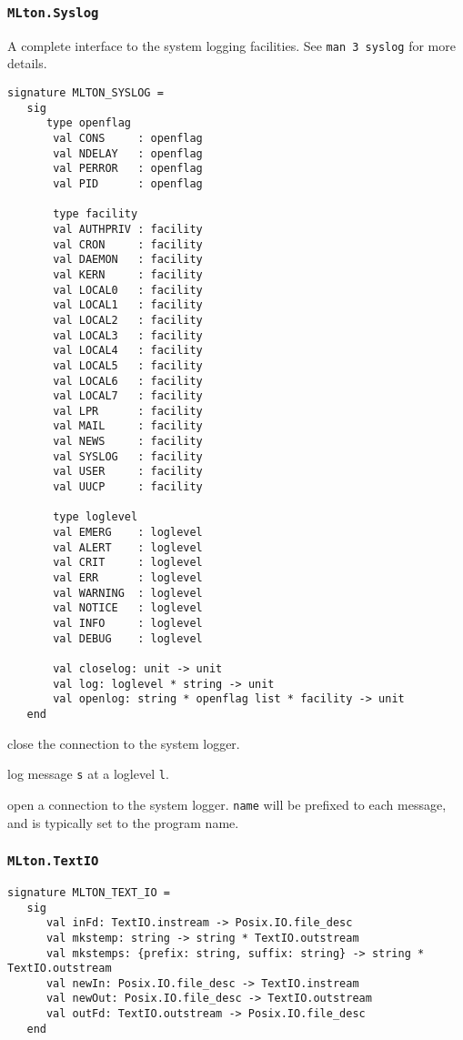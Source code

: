 \subsubsection{\tt MLton.Syslog}
A complete interface to the system logging facilities.  See {\tt man 3 syslog}
for more details.
\begin{verbatim}
signature MLTON_SYSLOG =
   sig
      type openflag
       val CONS     : openflag
       val NDELAY   : openflag
       val PERROR   : openflag
       val PID      : openflag
   
       type facility
       val AUTHPRIV : facility
       val CRON     : facility
       val DAEMON   : facility
       val KERN     : facility
       val LOCAL0   : facility
       val LOCAL1   : facility
       val LOCAL2   : facility
       val LOCAL3   : facility
       val LOCAL4   : facility
       val LOCAL5   : facility
       val LOCAL6   : facility
       val LOCAL7   : facility
       val LPR      : facility
       val MAIL     : facility
       val NEWS     : facility
       val SYSLOG   : facility
       val USER     : facility
       val UUCP     : facility
   
       type loglevel
       val EMERG    : loglevel
       val ALERT    : loglevel
       val CRIT     : loglevel
       val ERR      : loglevel
       val WARNING  : loglevel
       val NOTICE   : loglevel
       val INFO     : loglevel
       val DEBUG    : loglevel
   
       val closelog: unit -> unit
       val log: loglevel * string -> unit
       val openlog: string * openflag list * facility -> unit
   end
\end{verbatim}

\begin{description}
close the connection to the system logger.

log message {\tt s} at a loglevel {\tt l}.

open a connection to the system logger. {\tt name} will be prefixed to each
message, and is typically set to the program name.

\end{description}

\subsubsection{{\tt MLton.TextIO}}
\begin{verbatim}
signature MLTON_TEXT_IO =
   sig
      val inFd: TextIO.instream -> Posix.IO.file_desc
      val mkstemp: string -> string * TextIO.outstream
      val mkstemps: {prefix: string, suffix: string} -> string * TextIO.outstream
      val newIn: Posix.IO.file_desc -> TextIO.instream
      val newOut: Posix.IO.file_desc -> TextIO.outstream
      val outFd: TextIO.outstream -> Posix.IO.file_desc
   end
\end{verbatim}

